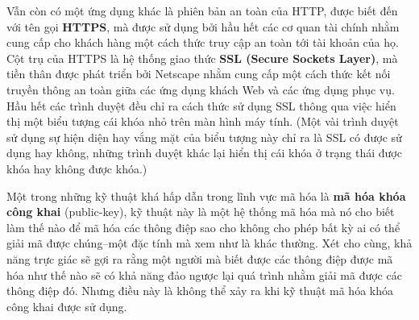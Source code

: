 Vẫn còn có một ứng dụng khác là phiên bản an toàn của HTTP, được biết đến với tên gọi
\textbf{HTTPS}, mà được sử dụng bởi hầu hết các cơ quan tài chính nhằm cung cấp cho khách
hàng một cách thức truy cập an toàn tới tài khoản của họ. Cột trụ của HTTPS là hệ thống
giao thức \textbf{SSL (Secure Sockets Layer)}, mà tiền thân được phát triển bởi Netscape
nhằm cung cấp một cách thức kết nối truyền thông an toàn giữa các ứng dụng khách Web và
các ứng dụng phục vụ. Hầu hết các trình duyệt đều chỉ ra cách thức sử dụng SSL thông qua
việc hiển thị một biểu tượng cái khóa nhỏ trên màn hình máy tính. (Một vài trình duyệt sử
dụng sự hiện diện hay vắng mặt của biểu tượng này chỉ ra là SSL có được sử dụng hay không,
những trình duyệt khác lại hiển thị cái khóa ở trạng thái được khóa hay không được khóa.)

Một trong những kỹ thuật khá hấp dẫn trong lĩnh vực mã hóa là \textbf{mã hóa khóa công
  khai} (public-key), kỹ thuật này là một hệ thống mã hóa mà nó cho biết làm thế nào để mã
hóa các thông điệp sao cho không cho phép bất kỳ ai có thể giải mã được chúng--một đặc
tính mà xem như là khác thường. Xét cho cùng, khả năng trực giác sẽ gợi ra rằng một người
mà biết được các thông điệp được mã hóa như thế nào sẽ có khả năng đảo ngược lại quá trình
nhằm giải mã được các thông điệp đó. Nhưng điều này là không thể xảy ra khi kỹ thuật mã
hóa khóa công khai được sử dụng.



